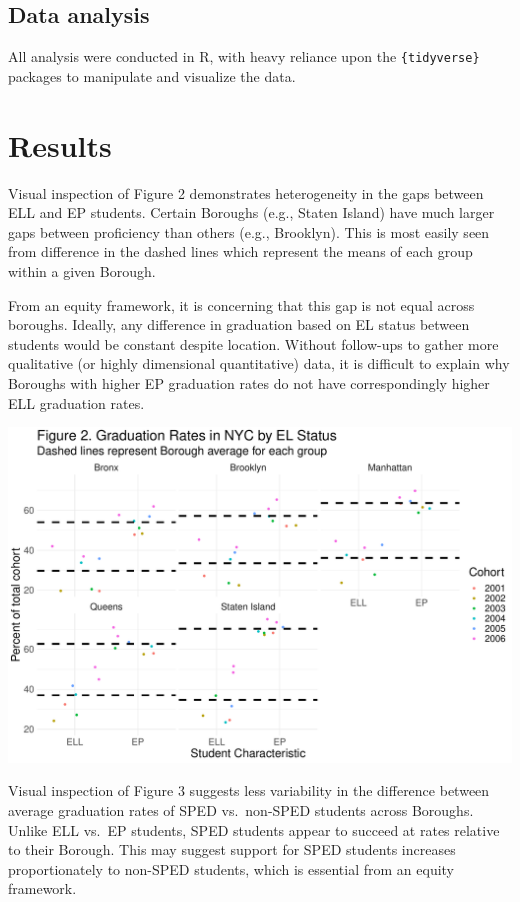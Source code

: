 \documentclass[
  english,
  man, fleqn, noextraspace]{apa6}
\begin{document}
\hypertarget{data-analysis}{%
\subsection{Data analysis}\label{data-analysis}}

All analysis were conducted in R, with heavy reliance upon the \texttt{\{tidyverse\}} packages to manipulate and visualize the data.

\hypertarget{results}{%
\section{Results}\label{results}}

Visual inspection of Figure 2 demonstrates heterogeneity in the gaps between ELL and EP students. Certain Boroughs (e.g., Staten Island) have much larger gaps between proficiency than others (e.g., Brooklyn). This is most easily seen from difference in the dashed lines which represent the means of each group within a given Borough.

From an equity framework, it is concerning that this gap is not equal across boroughs. Ideally, any difference in graduation based on EL status between students would be constant despite location. Without follow-ups to gather more qualitative (or highly dimensional quantitative) data, it is difficult to explain why Boroughs with higher EP graduation rates do not have correspondingly higher ELL graduation rates.

\includegraphics{EDLD_651_Final_Project_Draft_files/figure-latex/graph_results_EL_graph-1.pdf}

Visual inspection of Figure 3 suggests less variability in the difference between average graduation rates of SPED vs.~non-SPED students across Boroughs. Unlike ELL vs.~EP students, SPED students appear to succeed at rates relative to their Borough. This may suggest support for SPED students increases proportionately to non-SPED students, which is essential from an equity framework.
\end{document}
